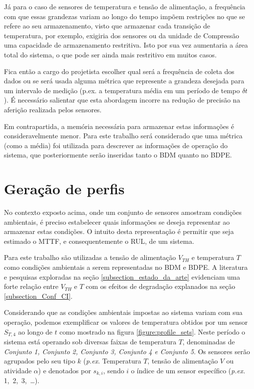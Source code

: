 Já para o caso de sensores de temperatura e tensão de alimentação, a frequência com que essas grandezas variam ao longo do tempo impõem restrições no que se refere ao seu armazenamento, visto que armazenar cada transição de temperatura, por exemplo, exigiria dos sensores ou da unidade de Compressão uma capacidade de armazenamento restritiva. Isto por sua vez aumentaria a área total do sistema, o que pode ser ainda mais restritivo em muitos casos.

Fica então a cargo do projetista escolher qual será a frequência de coleta dos dados ou se será usada alguma métrica que represente a grandeza desejada para um intervalo de medição (p.ex. a temperatura média em um período de tempo $\delta t$). É necessário salientar que esta abordagem incorre na redução de precisão na aferição realizada pelos sensores.

Em contrapartida, a memória necessária para armazenar estas informações é consideravelmente menor. Para este trabalho será considerado que uma métrica (como a média) foi utilizada para descrever as informações de operação do sistema, que posteriormente serão inseridas tanto o BDM quanto no BDPE.
\section{Geração de perfis}
\label{section_obtencao_dados}
No contexto exposto acima, onde um conjunto de sensores amostram condições ambientais, é preciso estabelecer quais informações se deseja representar ao armazenar estas condições. O intuito desta representação é permitir que seja estimado o MTTF, e consequentemente o RUL, de um sistema. 

Para este trabalho são utilizadas a tensão de alimentação $V_{TH}$ e temperatura $T$ como condições ambientais a serem representadas no BDM e BDPE. A literatura e pesquisas exploradas na seção \ref{subsection_estado_da_arte} evidenciam uma forte relação entre $V_{TH}$ e $T$ com os efeitos de degradação explanados na seção \ref{subsection_Conf_CI}.

Considerando que as condições ambientais impostas ao sistema variam com sua operação, podemos exemplificar os valores de temperatura obtidos por um sensor $S_{T,4}$ ao longo de $t$ como mostrado na figura \ref{figure:profile_sets}. Neste período o sistema está operando sob diversas faixas de temperatura $T$, denominadas de \textit{Conjunto 1, Conjunto 2, Conjunto 3, Conjunto 4 e Conjunto 5}. Os sensores serão agrupados pelo seu tipo $k$ (\textit{p.ex.} Temperatura $T$, tensão de alimentação $V$ ou atividade $\alpha$) e denotados por $s_{k,i}$, sendo $i$ o índice de um sensor específico (\textit{p.ex.} 1,\ 2,\ 3,\ \dots).

